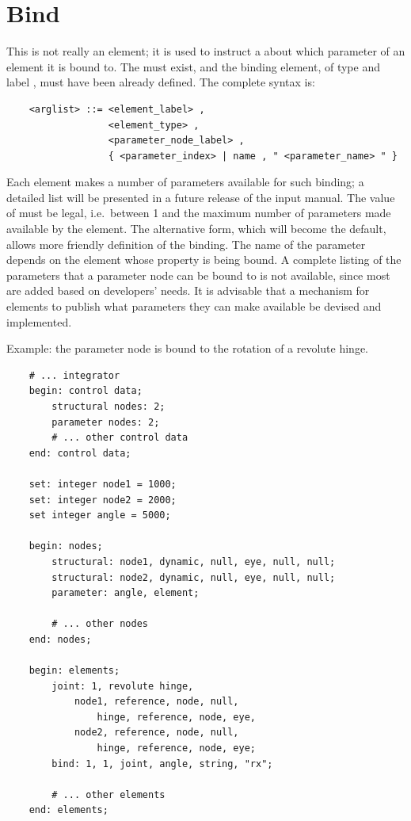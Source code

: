 \section{Bind}\label{sec:EL-BIND}
This is not really an element; it is used to instruct a 
about which parameter of an element it is bound to.
The  must exist, and the binding element, of type 
 and label , must have been already 
defined.
The complete syntax is:
\begin{verbatim}
    <arglist> ::= <element_label> , 
                  <element_type> ,
                  <parameter_node_label> , 
                  { <parameter_index> | name , " <parameter_name> " }
\end{verbatim}
Each element makes a number of parameters available for such binding; a
detailed list will be presented in a future release of the input manual.
The value of  must be legal, i.e.\ between 1 and the
maximum number of parameters made available by the element.
The alternative form, which will become the default, allows more
friendly definition of the binding.
The name of the parameter depends on the element whose property
is being bound.
A complete listing of the parameters that a parameter node 
can be bound to is not available, since most are added based
on developers' needs.
It is advisable that a mechanism for elements to publish 
what parameters they can make available be devised and implemented.

Example: the parameter node  is bound to the rotation
of a revolute hinge.
\begin{verbatim}
    # ... integrator
    begin: control data;
        structural nodes: 2;
        parameter nodes: 2;
        # ... other control data
    end: control data;

    set: integer node1 = 1000;
    set: integer node2 = 2000;
    set integer angle = 5000;

    begin: nodes;
        structural: node1, dynamic, null, eye, null, null;
        structural: node2, dynamic, null, eye, null, null;
        parameter: angle, element;

        # ... other nodes
    end: nodes;

    begin: elements;
        joint: 1, revolute hinge,
            node1, reference, node, null,
                hinge, reference, node, eye,
            node2, reference, node, null,
                hinge, reference, node, eye;
        bind: 1, 1, joint, angle, string, "rx";

        # ... other elements
    end: elements;
\end{verbatim}




